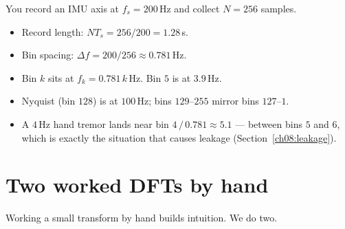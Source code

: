 \begin{example}
\label{ch08:ex-axes}
You record an IMU axis at $f_s = 200$\,Hz and collect $N = 256$ samples.
\begin{itemize}
\item Record length: $N T_s = 256/200 = 1.28$\,s.
\item Bin spacing: $\Delta f = 200/256 \approx 0.781$\,Hz.
\item Bin $k$ sits at $f_k = 0.781\,k$\,Hz. Bin $5$ is at $3.9$\,Hz.
\item Nyquist (bin $128$) is at $100$\,Hz; bins $129$--$255$ mirror bins
$127$--$1$.
\item A $4$\,Hz hand tremor lands near bin $4\,/\,0.781 \approx 5.1$ --- between
bins $5$ and $6$, which is exactly the situation that causes leakage
(Section~\ref{ch08:leakage}).
\end{itemize}
\end{example}

\section{Two worked DFTs by hand}
\label{ch08:byhand}

Working a small transform by hand builds intuition. We do two.

